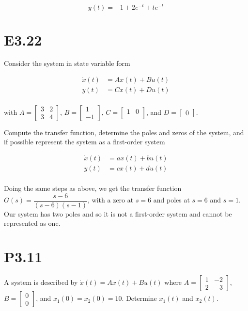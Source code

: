 \documentclass[11pt]{article}
\begin{document}
\[ y(t) = -1 + 2e^{-t} + te^{-t} \]

\section{E3.22}

Consider the system in state variable form

\begin{align*}
    \dot x(t) &= Ax(t) + Bu(t) \\
    y(t) &= Cx(t) + Du(t) \\
\end{align*}

with $A = \begin{bmatrix} 3 & 2 \\ 3 & 4 \end{bmatrix}$, $B = \begin{bmatrix} 1 \\ -1 \end{bmatrix}$, $C = \begin{bmatrix} 1 & 0 \\ \end{bmatrix}$, and $D = \begin{bmatrix} 0 \end{bmatrix}$.

Compute the transfer function, determine the poles and zeros of the system, and if possible represent the system as a first-order system

\begin{align*}
    \dot x(t) &= ax(t) + bu(t) \\
    y(t) &= cx(t) + du(t) \\
\end{align*}

Doing the same steps as above, we get the transfer function $G(s) = \dfrac{s - 6}{(s - 6)(s - 1)}$, with a zero at $s = 6$ and poles at $s = 6$ and $s = 1$. Our system has two poles and so it is not a first-order system and cannot be represented as one.

\section{P3.11}

A system is described by $\dot x(t) = Ax(t) + Bu(t)$ where $A = \begin{bmatrix} 1 & -2 \\ 2 & -3 \end{bmatrix}$, $B = \begin{bmatrix} 0 \\ 0 \end{bmatrix}$, and $x_1(0) = x_2(0) = 10$. Determine $x_1(t)$ and $x_2(t)$.
\end{document}
